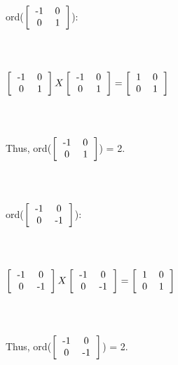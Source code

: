 \documentclass[11pt]{amsart}
\begin{document}
\\
\\
\\
ord($\left[{ \begin{tabular}{c c}  -1 & 0\\ 0 & 1\end{tabular}}\right]$):\\
\\
\\
\\
$\left[{ \begin{tabular}{c c}  -1 & 0\\ 0 & 1\end{tabular}}\right] X \left[{ \begin{tabular}{c c}  -1 & 0\\ 0 & 1\end{tabular}}\right] = \left[{ \begin{tabular}{c c}  1 & 0\\ 0 & 1\end{tabular}}\right]$\\
\\
\\
\\
Thus, ord($\left[{ \begin{tabular}{c c}  -1 & 0\\ 0 & 1\end{tabular}}\right]$) = 2.\\
\\
\\
\\
ord($\left[{ \begin{tabular}{c c}  -1 & 0\\ 0 & -1\end{tabular}}\right]$):\\
\\
\\
\\
$\left[{ \begin{tabular}{c c}  -1 & 0\\ 0 & -1\end{tabular}}\right] X \left[{ \begin{tabular}{c c}  -1 & 0\\ 0 & -1\end{tabular}}\right] = \left[{ \begin{tabular}{c c}  1 & 0\\ 0 & 1\end{tabular}}\right]$\\
\\
\\
\\
Thus, ord($\left[{ \begin{tabular}{c c}  -1 & 0\\ 0 & -1\end{tabular}}\right]$) = 2.\\
\end{document}
